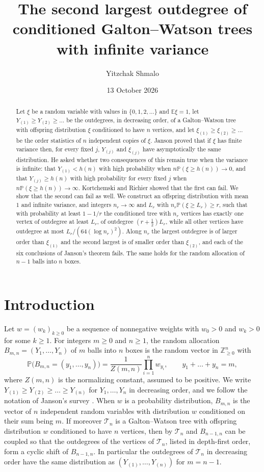 \documentclass[11pt]{amsart}
\title[The second largest outdegree with infinite variance]{The second largest outdegree of conditioned Galton--Watson trees with infinite variance}
\author{Yitzchak Shmalo}
\date{13 October 2026}
\numberwithin{equation}{section}
\newcommand{\Pp}{\mathbb P}
\newcommand{\E}{\mathbb E}
\newcommand{\Z}{\mathbb Z}
\newcommand{\cT}{\mathcal T}
\begin{document}
\begin{abstract}
Let $\xi$ be a random variable with values in $\{0,1,2,\dots\}$ and $\E\xi=1$, let $Y_{(1)}\ge Y_{(2)}\ge\dots$ be the outdegrees, in decreasing order, of a Galton--Watson tree with offspring distribution $\xi$ conditioned to have $n$ vertices, and let $\xi_{(1)}\ge\xi_{(2)}\ge\dots$ be the order statistics of $n$ independent copies of $\xi$. Janson proved that if $\xi$ has finite variance then, for every fixed $j$, $Y_{(j)}$ and $\xi_{(j)}$ have asymptotically the same distribution. He asked whether two consequences of this remain true when the variance is infinite: that $Y_{(1)}<h(n)$ with high probability when $n\Pp(\xi\ge h(n))\to0$, and that $Y_{(j)}\ge h(n)$ with high probability for every fixed $j$ when $n\Pp(\xi\ge h(n))\to\infty$. Kortchemski and Richier showed that the first can fail. We show that the second can fail as well. We construct an offspring distribution with mean $1$ and infinite variance, and integers $n_r\to\infty$ and $L_r$ with $n_r\Pp(\xi\ge L_r)\ge r$, such that with probability at least $1-1/r$ the conditioned tree with $n_r$ vertices has exactly one vertex of outdegree at least $L_r$, of outdegree $(r+\frac12)L_r$, while all other vertices have outdegree at most $L_r/(64(\log n_r)^2)$. Along $n_r$ the largest outdegree is of larger order than $\xi_{(1)}$ and the second largest is of smaller order than $\xi_{(2)}$, and each of the six conclusions of Janson's theorem fails. The same holds for the random allocation of $n-1$ balls into $n$ boxes.
\end{abstract}
\maketitle

\section{Introduction}\label{sec:intro}

Let $w=(w_k)_{k\ge0}$ be a sequence of nonnegative weights with $w_0>0$ and $w_k>0$ for some $k\ge1$. For integers $m\ge0$ and $n\ge1$, the random allocation $B_{m,n}=(Y_1,\dots,Y_n)$ of $m$ balls into $n$ boxes is the random vector in $\Z_{\ge0}^n$ with
\[
\Pp\bigl(B_{m,n}=(y_1,\dots,y_n)\bigr)=\frac{1}{Z(m,n)}\prod_{i=1}^nw_{y_i},\qquad y_1+\dots+y_n=m,
\]
where $Z(m,n)$ is the normalizing constant, assumed to be positive. We write $Y_{(1)}\ge Y_{(2)}\ge\dots\ge Y_{(n)}$ for $Y_1,\dots,Y_n$ in decreasing order, and we follow the notation of Janson's survey \cite{J12}. When $w$ is a probability distribution, $B_{m,n}$ is the vector of $n$ independent random variables with distribution $w$ conditioned on their sum being $m$. If moreover $\cT_n$ is a Galton--Watson tree with offspring distribution $w$ conditioned to have $n$ vertices, then by \cite[Lemma~17.1]{J12} $\cT_n$ and $B_{n-1,n}$ can be coupled so that the outdegrees of the vertices of $\cT_n$, listed in depth-first order, form a cyclic shift of $B_{n-1,n}$. In particular the outdegrees of $\cT_n$ in decreasing order have the same distribution as $(Y_{(1)},\dots,Y_{(n)})$ for $m=n-1$.
\end{document}
